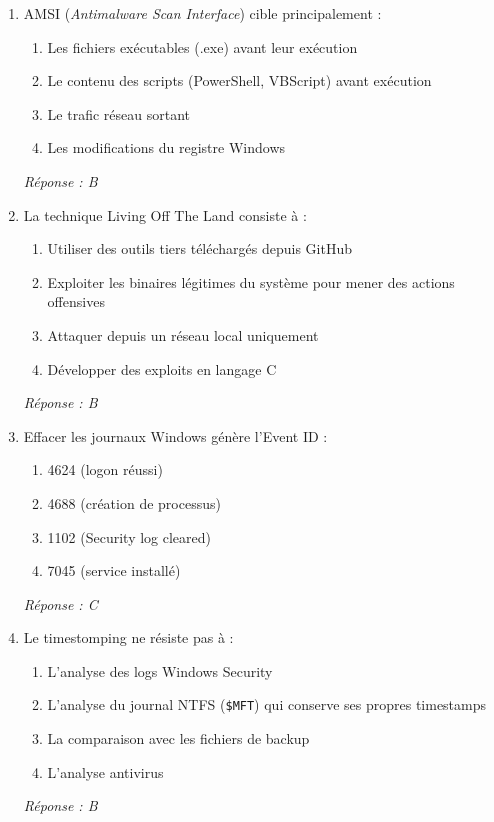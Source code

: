 \begin{enumerate}[resume]

\item AMSI (\textit{Antimalware Scan Interface}) cible principalement :
\begin{enumerate}[label=\Alph*.]
    \item Les fichiers exécutables (.exe) avant leur exécution
    \item Le contenu des scripts (PowerShell, VBScript) avant exécution
    \item Le trafic réseau sortant
    \item Les modifications du registre Windows
\end{enumerate}
\textit{Réponse : B}

\item La technique \og{}Living Off The Land\fg{} consiste à :
\begin{enumerate}[label=\Alph*.]
    \item Utiliser des outils tiers téléchargés depuis GitHub
    \item Exploiter les binaires légitimes du système pour mener des actions offensives
    \item Attaquer depuis un réseau local uniquement
    \item Développer des exploits en langage C
\end{enumerate}
\textit{Réponse : B}

\item Effacer les journaux Windows génère l'Event ID :
\begin{enumerate}[label=\Alph*.]
    \item 4624 (logon réussi)
    \item 4688 (création de processus)
    \item 1102 (Security log cleared)
    \item 7045 (service installé)
\end{enumerate}
\textit{Réponse : C}

\item Le timestomping ne résiste pas à :
\begin{enumerate}[label=\Alph*.]
    \item L'analyse des logs Windows Security
    \item L'analyse du journal NTFS (\texttt{\$MFT}) qui conserve ses propres timestamps
    \item La comparaison avec les fichiers de backup
    \item L'analyse antivirus
\end{enumerate}
\textit{Réponse : B}

\end{enumerate}

